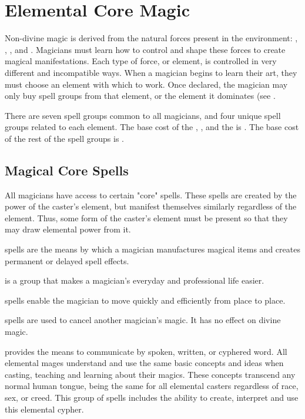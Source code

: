 \chapter{Elemental Core Magic}
\label{Ch:elemental-core-magic}
Non-divine magic is derived from the natural forces present in the environment: , , , and . Magicians must learn how to control and shape these forces to create magical manifestations. Each type of force, or element, is controlled in very different and incompatible ways. When a magician begins to learn their art, they must choose an element with which to work. Once declared, the magician may only buy spell groups from that element, or the element it dominates (see .

There are seven spell groups common to all magicians, and four unique spell groups related to each element. The base cost of the , ,  and the  is . The base cost of the rest of the spell groups is .

\section{Magical Core Spells}
All magicians have access to certain "core" spells. These spells are created by the power of the caster's element, but manifest themselves similarly regardless of the element. Thus, some form of the caster's element must be present so that they may draw elemental power from it.


 spells are the means by which a magician manufactures magical items and creates permanent or delayed spell effects.

 is a group that makes a magician's everyday and professional life easier.

 spells enable the magician to move quickly and efficiently from place to place.

 spells are used to cancel another magician's magic. It has no effect on divine magic.

 provides the means to communicate by spoken, written, or cyphered word. All elemental mages understand and use the same basic concepts and ideas when casting, teaching and learning about their magics. These concepts transcend any normal human tongue, being the same for all elemental casters regardless of race, sex, or creed. This group of spells includes the ability to create, interpret and use
this elemental cypher.

